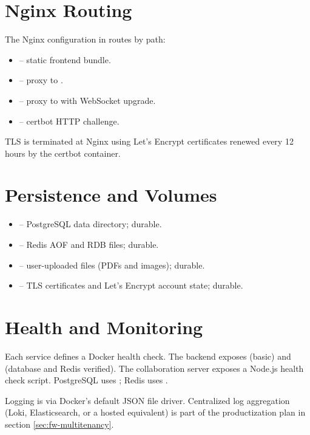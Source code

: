 \section{Nginx Routing}

The Nginx configuration in  routes by path:

\begin{itemize}
    \item \code{/} -- static frontend bundle.
    \item {} -- proxy to .
    \item {} -- proxy to  with WebSocket upgrade.
    \item {} -- certbot HTTP challenge.
\end{itemize}

TLS is terminated at Nginx using Let's Encrypt certificates renewed every 12 hours by the certbot container.

\section{Persistence and Volumes}

\begin{itemize}
    \item {} -- PostgreSQL data directory; durable.
    \item {} -- Redis AOF and RDB files; durable.
    \item {} -- user-uploaded files (PDFs and images); durable.
    \item {} -- TLS certificates and Let's Encrypt account state; durable.
\end{itemize}

\section{Health and Monitoring}

Each service defines a Docker health check. The backend exposes  (basic) and  (database and Redis verified). The collaboration server exposes a Node.js health check script. PostgreSQL uses ; Redis uses .

Logging is via Docker's default JSON file driver. Centralized log aggregation (Loki, Elasticsearch, or a hosted equivalent) is part of the productization plan in section \ref{sec:fw-multitenancy}.

